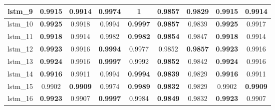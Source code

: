 \begin{table}[h]
\begin{tabular} {|c|c|c|c|c|c|c|c|c| }
        lstm\_9  & \textbf{0.9915}                     & 0.9914                              & 0.9974                              & \textbf{\cellcolor{green!50}1} & \textbf{\cellcolor{green!50}0.9857} & 0.9829                              & \textbf{0.9915}                     & 0.9914                              \\ \hline
        lstm\_10 & \textbf{\cellcolor{green!50}0.9925} & 0.9918                              & 0.9994                              & \textbf{0.9997}                & \textbf{\cellcolor{green!50}0.9857} & 0.9839                              & \textbf{\cellcolor{green!50}0.9925} & 0.9917                              \\ \hline
        lstm\_11 & \textbf{0.9918}                     & 0.9914                              & 0.9982                              & \textbf{0.9982}                & \textbf{0.9854}                     & 0.9847                              & \textbf{0.9918}                     & 0.9914                              \\ \hline
        lstm\_12 & \textbf{0.9923}                     & 0.9916                              & \textbf{0.9994}                     & 0.9977                         & 0.9852                              & \textbf{\cellcolor{green!50}0.9857} & \textbf{0.9923}                     & 0.9916                              \\ \hline
        lstm\_13 & \textbf{0.9924}                     & 0.9916                              & \textbf{\cellcolor{green!50}0.9997} & 0.9992                         & \textbf{0.9852}                     & 0.9842                              & \textbf{0.9924}                     & 0.9916                              \\ \hline
        lstm\_14 & \textbf{0.9916}                     & 0.9911                              & 0.9994                              & \textbf{0.9994}                & \textbf{0.9839}                     & 0.9829                              & \textbf{0.9916}                     & 0.9911                              \\ \hline
        lstm\_15 & 0.9902                              & \textbf{0.9909}                     & 0.9974                              & \textbf{0.9989}                & \textbf{0.9832}                     & 0.9829                              & 0.9902                              & \textbf{0.9909}                     \\ \hline
        lstm\_16 & \textbf{0.9923}                     & 0.9907                              & \textbf{\cellcolor{green!50}0.9997} & 0.9984                         & \textbf{0.9849}                     & 0.9832                              & \textbf{0.9923}                     & 0.9907                              \\ \hline

\end{tabular}
\end{table}
